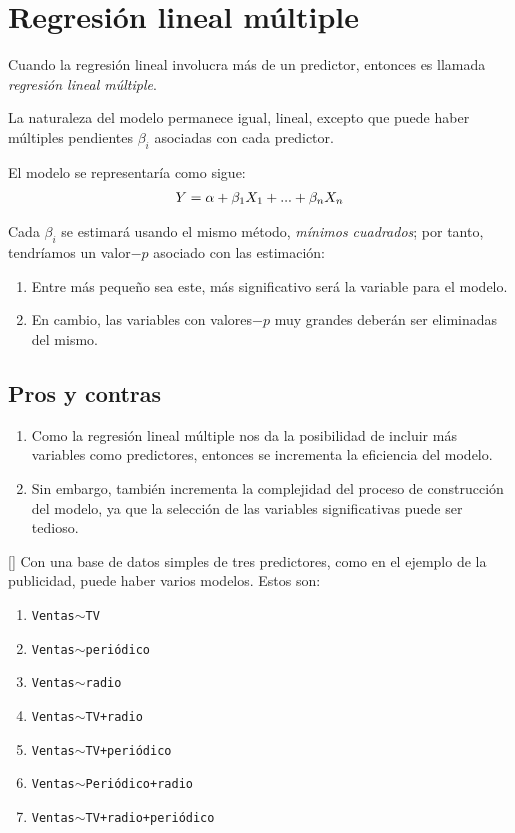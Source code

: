 \section{Regresión lineal múltiple}

Cuando la regresión lineal involucra más de un predictor, entonces es llamada \emph{regresión lineal múltiple}.



La naturaleza del modelo permanece igual, lineal, excepto que puede haber múltiples pendientes $\beta_{i}$ asociadas con cada predictor.




El modelo se representaría como sigue:
\begin{align}
	Y = \alpha + \beta_{1}X_{1}+...+\beta_{n}X_{n}
\end{align}



Cada $\beta_{i}$ se estimará usando el mismo método, \emph{mínimos cuadrados}; por tanto, tendríamos un valor$-p$ asociado con las estimación: 
\begin{enumerate}
	\item Entre más pequeño sea este, más significativo será la variable para el modelo. 
	\item En cambio, las variables con valores$-p$ muy grandes deberán ser eliminadas del mismo.
\end{enumerate}


\subsection{Pros y contras}
\begin{enumerate}
	\item Como la regresión lineal múltiple nos da la posibilidad de incluir más variables como predictores, entonces se incrementa la eficiencia del modelo. 
	
	\item Sin embargo, también incrementa la complejidad del proceso de construcción del modelo, ya que la selección de las variables significativas puede ser tedioso.
\end{enumerate}


[]{}
Con una base de datos simples de tres predictores, como en el ejemplo de la publicidad, puede haber varios modelos. Estos son:
\begin{enumerate}[Modelo 1:]
	\item \texttt{Ventas$\sim$TV}
	\item \texttt{Ventas$\sim$periódico}
	\item \texttt{Ventas$\sim$radio}
	\item \texttt{Ventas$\sim$TV+radio}
	\item \texttt{Ventas$\sim$TV+periódico}
	\item \texttt{Ventas$\sim$Periódico+radio}
	\item \texttt{Ventas$\sim$TV+radio+periódico}
\end{enumerate}




